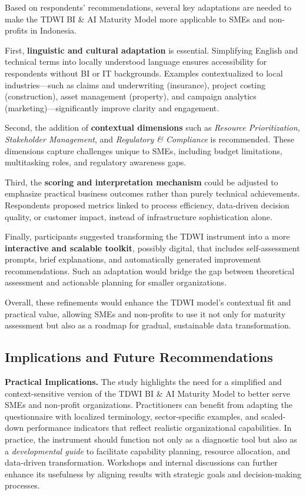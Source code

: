 \documentclass[conference]{IEEEtran}
\begin{document}
Based on respondents’ recommendations, several key adaptations are needed to make the TDWI BI \& AI Maturity Model more applicable to SMEs and non-profits in Indonesia.  

First, \textbf{linguistic and cultural adaptation} is essential. Simplifying English and technical terms into locally understood language ensures accessibility for respondents without BI or IT backgrounds. Examples contextualized to local industries—such as claims and underwriting (insurance), project costing (construction), asset management (property), and campaign analytics (marketing)—significantly improve clarity and engagement.

Second, the addition of \textbf{contextual dimensions} such as \emph{Resource Prioritization}, \emph{Stakeholder Management}, and \emph{Regulatory \& Compliance} is recommended. These dimensions capture challenges unique to SMEs, including budget limitations, multitasking roles, and regulatory awareness gaps.

Third, the \textbf{scoring and interpretation mechanism} could be adjusted to emphasize practical business outcomes rather than purely technical achievements. Respondents proposed metrics linked to process efficiency, data-driven decision quality, or customer impact, instead of infrastructure sophistication alone.

Finally, participants suggested transforming the TDWI instrument into a more \textbf{interactive and scalable toolkit}, possibly digital, that includes self-assessment prompts, brief explanations, and automatically generated improvement recommendations. Such an adaptation would bridge the gap between theoretical assessment and actionable planning for smaller organizations.  

Overall, these refinements would enhance the TDWI model’s contextual fit and practical value, allowing SMEs and non-profits to use it not only for maturity assessment but also as a roadmap for gradual, sustainable data transformation.


\subsection{Implications and Future Recommendations}
\label{sec:implications_recommendations}

\textbf{Practical Implications.}  
The study highlights the need for a simplified and context-sensitive version of the TDWI BI \& AI Maturity Model to better serve SMEs and non-profit organizations.  
Practitioners can benefit from adapting the questionnaire with localized terminology, sector-specific examples, and scaled-down performance indicators that reflect realistic organizational capabilities.  
In practice, the instrument should function not only as a diagnostic tool but also as a \textit{developmental guide} to facilitate capability planning, resource allocation, and data-driven transformation.  
Workshops and internal discussions can further enhance its usefulness by aligning results with strategic goals and decision-making processes.
\end{document}
